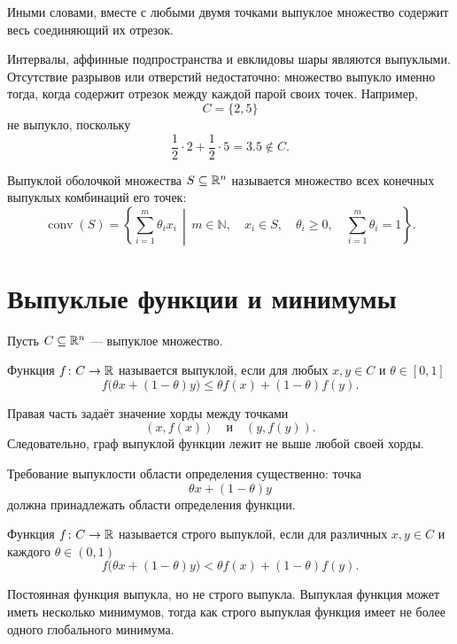 Иными словами, вместе с любыми двумя точками выпуклое множество
содержит весь соединяющий их отрезок.

Интервалы, аффинные подпространства и евклидовы шары являются
выпуклыми. Отсутствие разрывов или отверстий недостаточно: множество
выпукло именно тогда, когда содержит отрезок между каждой парой своих
точек. Например,
\[
    C=\{2,5\}
\]
не выпукло, поскольку
\[
    \frac12\cdot2+\frac12\cdot5=3.5\notin C.
\]

\begin{definition}
Выпуклой оболочкой множества \(S\subseteq\mathbb{R}^n\) называется множество
всех конечных выпуклых комбинаций его точек:
\[
    \operatorname{conv}(S)
    =
    \left\{
        \sum_{i=1}^{m}\theta_i x_i
        \,\middle|\,
        m\in\mathbb N,\quad
        x_i\in S,\quad
        \theta_i\ge0,\quad
        \sum_{i=1}^{m}\theta_i=1
    \right\}.
\]
\end{definition}

\section{Выпуклые функции и минимумы}

Пусть \(C\subseteq\mathbb{R}^n\) --- выпуклое множество.

\begin{definition}
Функция \(f\colon C\to\mathbb{R}\) называется выпуклой, если для любых
\(x,y\in C\) и \(\theta\in[0,1]\)
\[
    f\bigl(\theta x+(1-\theta)y\bigr)
    \le
    \theta f(x)+(1-\theta)f(y).
\]
\end{definition}

Правая часть задаёт значение хорды между точками
\[
    (x,f(x))
    \quad\text{и}\quad
    (y,f(y)).
\]
Следовательно, граф выпуклой функции лежит не выше любой своей хорды.

Требование выпуклости области определения существенно: точка
\[
    \theta x+(1-\theta)y
\]
должна принадлежать области определения функции.

\begin{definition}
Функция \(f\colon C\to\mathbb{R}\) называется строго выпуклой, если для
различных \(x,y\in C\) и каждого \(\theta\in(0,1)\)
\[
    f\bigl(\theta x+(1-\theta)y\bigr)
    <
    \theta f(x)+(1-\theta)f(y).
\]
\end{definition}

Постоянная функция выпукла, но не строго выпукла. Выпуклая функция
может иметь несколько минимумов, тогда как строго выпуклая функция
имеет не более одного глобального минимума.



